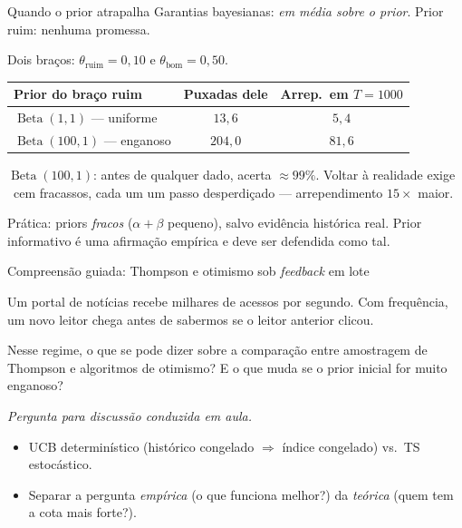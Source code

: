 \documentclass[aspectratio=169, 11pt]{beamer}
\newcommand{\paradiscussao}{\smallskip
  {\footnotesize\color{rlCinza}\itshape Pergunta para discussão conduzida em aula.}}
\newcommand{\Bdist}{\operatorname{Beta}}
\begin{document}
\begin{frame}{Quando o prior atrapalha}
  Garantias bayesianas: \emph{em média sobre o prior}. Prior ruim:
  nenhuma promessa.

  \smallskip
  \begin{center}\small
  Dois braços: $\theta_{\text{ruim}} = 0{,}10$ e $\theta_{\text{bom}} = 0{,}50$.

  \smallskip
  \begin{tabular}{@{}lcc@{}}
    \toprule
    \textbf{Prior do braço ruim} & \textbf{Puxadas dele} &
      \textbf{Arrep.\ em $T = 1000$} \\
    \midrule
    $\Bdist(1,1)$ — uniforme   & $13{,}6$  & $5{,}4$ \\
    $\Bdist(100,1)$ — enganoso & $204{,}0$ & $81{,}6$ \\
    \bottomrule
  \end{tabular}
  \end{center}

  \begin{alertabox}
    $\Bdist(100,1)$: antes de qualquer dado, acerta $\approx 99\%$.
    Voltar à realidade exige ~cem fracassos, cada um um passo
    desperdiçado — arrependimento $15\times$ maior.
  \end{alertabox}

  \smallskip
  {\small\color{rlCinza} Prática: priors \emph{fracos} ($\alpha+\beta$
  pequeno), salvo evidência histórica real. Prior informativo é uma
  afirmação empírica e deve ser defendida como tal.}
\end{frame}

\begin{frame}{Compreensão guiada: Thompson e otimismo sob \emph{feedback} em lote}
  \begin{quizbox}{}
    Um portal de notícias recebe milhares de acessos por segundo. Com
    frequência, um novo leitor chega \alert{antes} de sabermos se o leitor
    anterior clicou.

    \smallskip
    Nesse regime, o que se pode dizer sobre a comparação entre amostragem
    de Thompson e algoritmos de otimismo? E o que muda se o prior inicial
    for muito enganoso?
  \end{quizbox}
  \paradiscussao

  \medskip
  \begin{itemize}
    \item UCB \alert{determinístico} (histórico congelado $\Rightarrow$
          índice congelado) vs.\ TS \alert{estocástico}.
    \item Separar a pergunta \emph{empírica} (o que funciona melhor?) da
          \emph{teórica} (quem tem a cota mais forte?).
  \end{itemize}
\end{frame}
\end{document}
